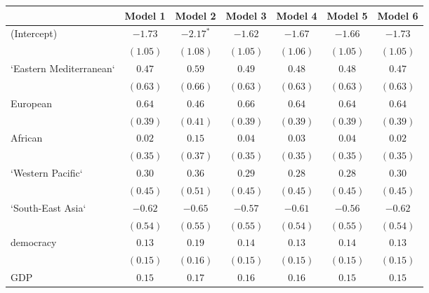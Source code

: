 
\begin{table}[!h]
\begin{center}
\begin{tabular}{l c c c c c c }
\toprule
 & Model 1 & Model 2 & Model 3 & Model 4 & Model 5 & Model 6 \\
\midrule
(Intercept)             & $-1.73$      & $-2.17^{*}$  & $-1.62$      & $-1.67$      & $-1.66$      & $-1.73$      \\
                        & $(1.05)$     & $(1.08)$     & $(1.05)$     & $(1.06)$     & $(1.05)$     & $(1.05)$     \\
`Eastern Mediterranean` & $0.47$       & $0.59$       & $0.49$       & $0.48$       & $0.48$       & $0.47$       \\
                        & $(0.63)$     & $(0.66)$     & $(0.63)$     & $(0.63)$     & $(0.63)$     & $(0.63)$     \\
European                & $0.64$       & $0.46$       & $0.66$       & $0.64$       & $0.64$       & $0.64$       \\
                        & $(0.39)$     & $(0.41)$     & $(0.39)$     & $(0.39)$     & $(0.39)$     & $(0.39)$     \\
African                 & $0.02$       & $0.15$       & $0.04$       & $0.03$       & $0.04$       & $0.02$       \\
                        & $(0.35)$     & $(0.37)$     & $(0.35)$     & $(0.35)$     & $(0.35)$     & $(0.35)$     \\
`Western Pacific`       & $0.30$       & $0.36$       & $0.29$       & $0.28$       & $0.28$       & $0.30$       \\
                        & $(0.45)$     & $(0.51)$     & $(0.45)$     & $(0.45)$     & $(0.45)$     & $(0.45)$     \\
`South-East Asia`       & $-0.62$      & $-0.65$      & $-0.57$      & $-0.61$      & $-0.56$      & $-0.62$      \\
                        & $(0.54)$     & $(0.55)$     & $(0.55)$     & $(0.54)$     & $(0.55)$     & $(0.54)$     \\
democracy               & $0.13$       & $0.19$       & $0.14$       & $0.13$       & $0.14$       & $0.13$       \\
                        & $(0.15)$     & $(0.16)$     & $(0.15)$     & $(0.15)$     & $(0.15)$     & $(0.15)$     \\
GDP                     & $0.15$       & $0.17$       & $0.16$       & $0.16$       & $0.15$       & $0.15$       \\

\end{tabular}
\end{center}
\end{table}
